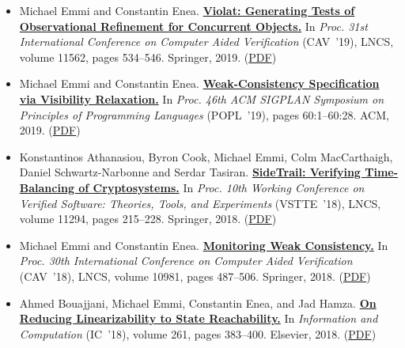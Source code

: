 \documentclass{article}
\begin{document}
\begin{itemize}[leftmargin=0cm,label={}]
    \item Michael Emmi and Constantin Enea. {\bf\href{%
    https://doi.org/10.1007/978-3-030-25543-5_30}{%
    Violat: Generating Tests of Observational Refinement for Concurrent Objects.}} In \emph{ Proc. 31st International Conference on Computer Aided Verification } (CAV ’19), LNCS, volume 11562, pages 534–546. Springer, 2019. (\href{https://michael-emmi.github.io/https://github.com/michael-emmi/research-papers/raw/master/conf-cav-EmmiE19.pdf}{PDF})


    \item Michael Emmi and Constantin Enea. {\bf\href{%
    https://dl.acm.org/citation.cfm?id=3290373}{%
    Weak-Consistency Specification via Visibility Relaxation.}} In \emph{ Proc. 46th ACM SIGPLAN Symposium on Principles of Programming Languages } (POPL ’19), pages 60:1–60:28. ACM, 2019. (\href{https://michael-emmi.github.io/https://github.com/michael-emmi/research-papers/raw/master/conf-popl-EmmiE19.pdf}{PDF})


    \item Konstantinos Athanasiou, Byron Cook, Michael Emmi, Colm MacCarthaigh, Daniel Schwartz-Narbonne and Serdar Tasiran. {\bf\href{%
    https://doi.org/10.1007/978-3-030-03592-1_12}{%
    SideTrail: Verifying Time-Balancing of Cryptosystems.}} In \emph{ Proc. 10th Working Conference on Verified Software: Theories, Tools, and Experiments } (VSTTE ’18), LNCS, volume 11294, pages 215–228. Springer, 2018. (\href{https://michael-emmi.github.io/https://github.com/michael-emmi/research-papers/raw/master/conf-vstte-AthanasiouCEMST18.pdf}{PDF})


    \item Michael Emmi and Constantin Enea. {\bf\href{%
    https://doi.org/10.1007/978-3-319-96145-3_26}{%
    Monitoring Weak Consistency.}} In \emph{ Proc. 30th International Conference on Computer Aided Verification } (CAV ’18), LNCS, volume 10981, pages 487–506. Springer, 2018. (\href{https://michael-emmi.github.io/https://github.com/michael-emmi/research-papers/raw/master/conf-cav-EmmiE18.pdf}{PDF})


    \item Ahmed Bouajjani, Michael Emmi, Constantin Enea, and Jad Hamza. {\bf\href{%
    https://doi.org/10.1016/j.ic.2018.02.014}{%
    On Reducing Linearizability to State Reachability.}} In \emph{ Information and Computation } (IC ’18), volume 261, pages 383–400. Elsevier, 2018. (\href{https://michael-emmi.github.io/https://github.com/michael-emmi/research-papers/raw/master/journals-iandc-BouajjaniEEH18.pdf}{PDF})



\end{itemize}
\end{document}
